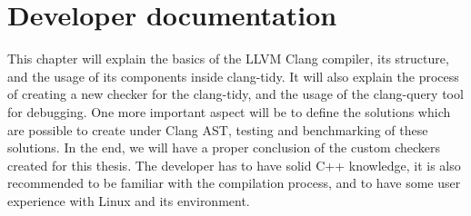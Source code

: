 \chapter{Developer documentation}


This chapter will explain the basics of the LLVM Clang compiler, its structure, and the usage of its components inside clang-tidy. It will also explain the process of creating a new checker for the clang-tidy, and the usage of the clang-query tool for debugging. One more important aspect will be to define the solutions which are possible to create under Clang AST, testing and benchmarking of these solutions. In the end, we will have a proper conclusion of the custom checkers created for this thesis. The developer has to have solid C++ knowledge, it is also recommended to be familiar with the compilation process, and to have some user experience with Linux and its environment.





